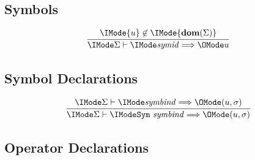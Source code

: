 \subsection*{Symbols \hfill {}}

\begin{gather}
  \infer{
    \Elab{\Sigma}{\SortSymId}{u}
  }{
    \IMode{u}\not\in\IMode{\mathbf{dom}(\Sigma)}
  }
\end{gather}

\subsection*{Symbol Declarations\hfill {}}
\begin{gather}
  \infer{
    \Elab{\Sigma}{
      \ProdSymDecl{\SortSymBind}
    }{(u,\sigma)}
  }{
    \Elab{\Sigma}{\SortSymBind}{(u,\sigma)}
  }
\end{gather}


\subsection*{Operator Declarations\hfill {}}

